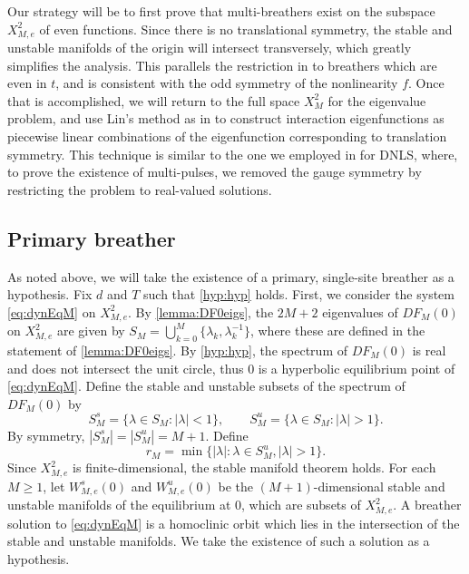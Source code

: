 \documentclass[12pt,reqno]{amsart}
\theoremstyle{definition}
\begin{document}
Our strategy will be to first prove that multi-breathers exist on the subspace $X_{M,e}^2$ of even functions. Since there is no translational symmetry, the stable and unstable manifolds of the origin will intersect transversely, which greatly simplifies the analysis. This parallels the restriction in \cite{Pelinovsky2012} to breathers which are even in $t$, and is consistent with the odd symmetry of the nonlinearity $f$. 
Once that is accomplished, we will return to the full space $X_{M}^2$ for the eigenvalue problem, and use Lin's method as in \cites{Parker2021,Parker2020,Sandstede1998} to construct interaction eigenfunctions as piecewise linear combinations of the eigenfunction corresponding to translation symmetry. This technique is similar to the one we employed in \cite{Parker2020} for DNLS, where, to prove the existence of multi-pulses, we removed the gauge symmetry by restricting the problem to real-valued solutions.

\subsection{Primary breather}

As noted above, we will take the existence of a primary, single-site breather as a hypothesis. 
Fix $d$ and $T$ such that \cref{hyp:hyp} holds. First, we consider the system \cref{eq:dynEqM} on $X_{M,e}^2$. By \cref{lemma:DF0eigs}, the $2M+2$ eigenvalues of $DF_M(0)$ on $X_{M,e}^2$ are given by $S_M = \bigcup_{k=0}^M \{\lambda_k, \lambda_k^{-1} \}$, where these are defined in the statement of \cref{lemma:DF0eigs}. By \cref{hyp:hyp}, the spectrum of $DF_M(0)$ is real and does not intersect the unit circle, thus 0 is a hyperbolic equilibrium point of \cref{eq:dynEqM}. Define the stable and unstable subsets of the spectrum of $DF_M(0)$ by
\[
S_M^s = \{ \lambda \in S_M : |\lambda| < 1\}, \qquad S_M^u = \{ \lambda \in S_M : |\lambda| > 1\}.
\]
By symmetry, $|S_M^s| = |S_M^u| = M+1$. Define
\begin{equation}\label{eq:defrM}
r_M = \min \{ |\lambda| : \lambda \in S_M^u, |\lambda| > 1 \}.
\end{equation}
Since $X_{M,e}^2$ is finite-dimensional, the stable manifold theorem holds. For each $M \geq 1$, let $W_{M,e}^s(0)$ and $W_{M,e}^u(0)$ be the $(M+1)$-dimensional stable and unstable manifolds of the equilibrium at 0, which are subsets of $X_{M,e}^2$. A breather solution to \cref{eq:dynEqM} is a homoclinic orbit which lies in the intersection of the stable and unstable manifolds. We take the existence of such a solution as a hypothesis.
\end{document}
